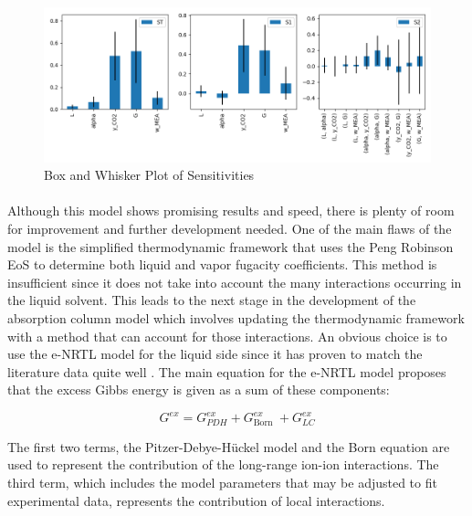 \documentclass[12pt, letterpaper]{article}
\begin{document}
\begin{figure}[ht]
    \centering
    \includegraphics[width=16cm]{box.png}
    \caption{Box and Whisker Plot of Sensitivities}
\end{figure}

\paragraph{}
Although this model shows promising results and speed, there is plenty of room for improvement and further development needed. One of the main flaws of the model is the simplified thermodynamic framework that uses the Peng Robinson EoS to determine both liquid and vapor fugacity coefficients. This method is insufficient since it does not take into account the many interactions occurring in the liquid solvent. This leads to the next stage in the development of the absorption column model which involves updating the thermodynamic framework with a method that can account for those interactions. An obvious choice is to use the e-NRTL model for the liquid side since it has proven to match the literature data quite well \cite{Morgan2017}. The main equation for the e-NRTL model proposes that the excess Gibbs energy is given as a sum of these components:

\begin{equation}
    G^{e x}=G_{P D H}^{e x}+G_{\text {Born }}^{e x}+G_{L C}^{e x}
\end{equation}

The first two terms, the Pitzer-Debye-Hückel model and the Born equation are used to represent the contribution of the long-range ion-ion interactions. The third term, which includes the model parameters that may be adjusted to fit experimental data, represents the contribution of local interactions. 
\end{document}
